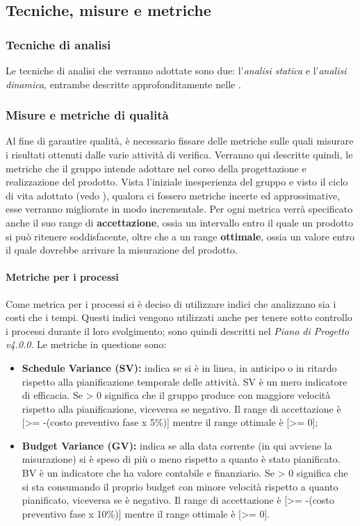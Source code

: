 \subsection{Tecniche, misure e metriche}
\label{tecniche_misure_metodi}

\subsubsection{Tecniche di analisi}
\label{tecniche_di_analisi}
Le tecniche di analisi che verranno adottate sono due: l'\textit{analisi statica} e l'\textit{analisi dinamica}, entrambe descritte approfonditamente nelle \NdP{}.

\subsubsection{Misure e metriche di qualità}
\label{misure_e_metriche}
Al fine di garantire qualità, è necessario fissare delle metriche sulle quali misurare i risultati ottenuti dalle varie attività di verifica. Verranno qui descritte quindi, le metriche che il gruppo intende adottare nel corso della progettazione e realizzazione del prodotto. Vista l'iniziale inesperienza del gruppo e visto il ciclo di vita adottato (vedo \PdP), qualora ci fossero metriche incerte ed approssimative, esse verranno migliorate in modo incrementale.
Per ogni metrica verrà specificato anche il suo range di \textbf{accettazione}, ossia un intervallo entro il quale un prodotto si può ritenere soddisfacente, oltre che a un range \textbf{ottimale}, ossia un valore entro il quale dovrebbe arrivare la misurazione del prodotto.
\paragraph{Metriche per i processi}
\label{metriche_processi}
Come metrica per i processi si è deciso di utilizzare indici che analizzano sia i costi che i tempi. Questi indici vengono utilizzati anche per tenere sotto controllo i processi durante il loro svolgimento; sono quindi descritti nel \emph{Piano di Progetto v4.0.0}.
Le metriche in questione sono:
\begin{itemize}
 	\item \textbf{Schedule Variance\glossario{} (SV\glossario{}):} indica se si è in linea, in anticipo o in ritardo rispetto alla pianificazione temporale delle attività. SV\glossario{} è un mero indicatore di efficacia. Se > 0 significa che il gruppo produce con maggiore velocità rispetto alla pianificazione, viceversa se negativo. Il range di accettazione è [>= -(costo preventivo fase x 5\%)] mentre il range ottimale è [>= 0];
 	\item \textbf{Budget Variance\glossario{} (GV\glossario{}): }indica se alla data corrente (in qui avviene la misurazione) si è speso di più o meno rispetto a quanto è stato pianificato. BV\glossario{} è un indicatore che ha valore contabile e finanziario. Se > 0 significa che si sta consumando il proprio budget con minore velocità rispetto a quanto pianificato, viceversa se è negativo. Il range di accettazione è [>= -(costo preventivo fase x 10\%)] mentre il range ottimale è [>= 0].
\end{itemize}
